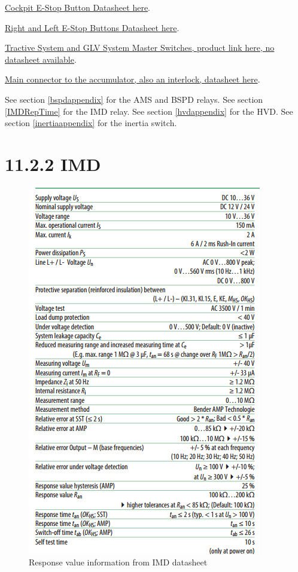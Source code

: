 \documentclass{article}
\begin{document}
\href{http://products.eao.com/index.php?IdTreeGroup=2344&IdProduct=48667&lang=en}{Cockpit E-Stop Button Datasheet here}.

\href{http://products.eao.com/index.php?IdTreeGroup=2344&IdProduct=48533&lang=en}{Right and Left E-Stop Buttons Datasheet here}.

\href{http://www.amazon.com/Volt-Battery-Disconnect-Kill-Switch/dp/B007O0BBFM}{Tractive System and GLV System Master Switches, product link here, no datasheet available}.

\href{http://www.mouser.com/pdfdocs/9876510101.PDF}{Main connector to the accumulator, also an interlock, datasheet here}.

See section \ref{bspdappendix} for the AMS and BSPD relays.
See section \ref{IMDRepTime} for the IMD relay.
See section \ref{hvdappendix} for the HVD.
See section \ref{inertiaappendix} for the inertia switch.

\section*{11.2.2 IMD} \label{imdappendix}
\begin{figure}[H]
    \centering
    \includegraphics[width=0.45 \textheight]{IMD_datasheet_snip}
    \caption{Response value information from IMD datasheet}
    \label{IMDresponsetime}
\end{figure}
\end{document}

